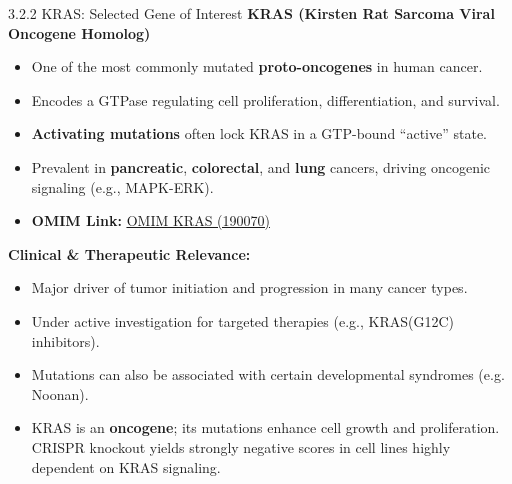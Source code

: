\documentclass[10pt]{beamer}
\let\oldhref\href
\renewcommand{\href}[2]{\oldhref{#1}{\uline{#2}}}
\begin{document}
\begin{frame}{3.2.2 KRAS: Selected Gene of Interest}
  \textbf{KRAS (Kirsten Rat Sarcoma Viral Oncogene Homolog)}
  \begin{itemize}
    \item One of the most commonly mutated \textbf{proto-oncogenes} in human cancer.
    \item Encodes a GTPase regulating cell proliferation, differentiation, and survival.
    \item \textbf{Activating mutations} often lock KRAS in a GTP-bound “active” state.
    \item Prevalent in \textbf{pancreatic}, \textbf{colorectal}, and \textbf{lung} cancers,
      driving oncogenic signaling (e.g., MAPK-ERK).
    \item \textbf{OMIM Link:} \href{https://omim.org/entry/190070}{OMIM KRAS (190070)}
  \end{itemize}

  \vspace{0.3cm}
  \textbf{Clinical \& Therapeutic Relevance:}
  \begin{itemize}
    \item Major driver of tumor initiation and progression in many cancer types.
    \item Under active investigation for targeted therapies (e.g., KRAS(G12C) inhibitors).
    \item Mutations can also be associated with certain developmental syndromes (e.g. Noonan).
    \item KRAS is an \textbf{oncogene}; its mutations enhance cell growth and proliferation. CRISPR knockout yields strongly negative scores in cell lines highly dependent on KRAS signaling.
  \end{itemize}
\end{frame}
\end{document}
